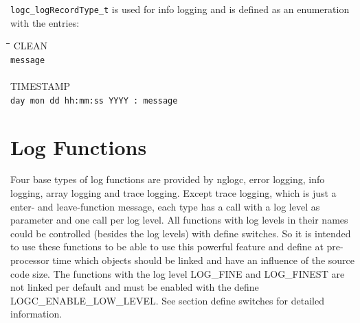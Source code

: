 \documentclass[a4paper, titlepage, 11pt]{article}
\begin{document}
\small\verb+logc_logRecordType_t+ \normalsize is used for info logging and is defined as an enumeration with the entries:
\begin{tabbing}
\hspace*{1cm}\=\hspace*{2cm}\=\hspace*{0,6cm}\= \kill
\> CLEAN \\
\> \small\verb+message+ \\ \\
\> TIMESTAMP \\
\> \small\verb+day mon dd hh:mm:ss YYYY : message+ \\
\end{tabbing}

\newpage

\section{Log Functions}
Four base types of log functions are provided by nglogc, error logging, info
logging, array logging and trace logging. Except trace logging, which is just a
enter- and leave-function message, each type has a call with a log level as
parameter and one call per log level. All functions with log levels in their
names could be controlled (besides the log levels) with define switches. So it
is intended to use these functions to be able to use this powerful feature and
define at pre-processor time which objects should be linked and have an
influence of the source code size. The functions with the log level LOG\_FINE
and LOG\_FINEST are not linked per default and must be enabled with the define
LOGC\_ENABLE\_LOW\_LEVEL. See section define switches for detailed
information.\newline
\end{document}
